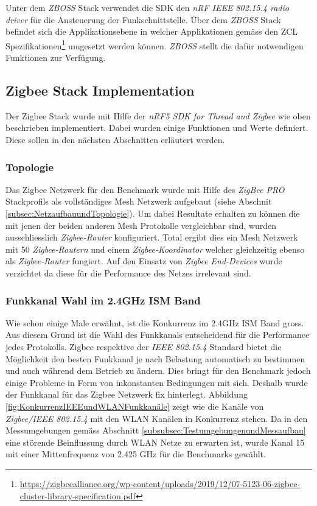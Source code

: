 Unter dem \textit{ZBOSS} Stack verwendet die SDK den \textit{nRF IEEE 802.15.4 radio driver} für die Ansteuerung der Funkschnittstelle.
Über dem \textit{ZBOSS} Stack befindet sich die Applikationsebene in welcher Applikationen gemäss den ZCL Spezifikationen\footnote{\url{https://zigbeealliance.org/wp-content/uploads/2019/12/07-5123-06-zigbee-cluster-library-specification.pdf}\cite{the_zigbee_alliance_zigbee_2016}} umgesetzt werden können.
\textit{ZBOSS} stellt die dafür notwendigen Funktionen zur Verfügung.


\subsection{Zigbee Stack Implementation}\label{subsec:ZigbeeStackImplementation}
Der Zigbee Stack wurde mit Hilfe der \textit{nRF5 SDK for Thread and Zigbee} wie oben beschrieben implementiert.
Dabei wurden einige Funktionen und Werte definiert.
Diese sollen in den nächsten Abschnitten erläutert werden.

\subsubsection{Topologie}\label{subsubsec:ZigbeeTopologie}
Das Zigbee Netzwerk für den Benchmark wurde mit Hilfe des \textit{ZigBee PRO} Stackprofils als vollständiges Mesh Netzwerk aufgebaut (siehe Abschnit \ref{subsec:NetzaufbauundTopologie}).
Um dabei Resultate erhalten zu können die mit jenen der beiden anderen Mesh Protokolle vergleichbar sind, wurden ausschliesslich \textit{Zigbee-Router} konfiguriert.
Total ergibt dies ein Mesh Netzwerk mit 50 \textit{Zigbee-Routern} und einem \textit{Zigbee-Koordinator} welcher gleichzeitig ebenso als \textit{Zigbee-Router} fungiert.
Auf den Einsatz von \textit{Zigbee End-Devices} wurde verzichtet da diese für die Performance des Netzes irrelevant sind.

\subsubsection{Funkkanal Wahl im 2.4GHz ISM Band}\label{subsubsec:FunkkanalWahlim2.4GHzISMBand}
Wie schon einige Male erwähnt, ist die Konkurrenz im 2.4GHz ISM Band gross.
Aus diesem Grund ist die Wahl des Funkkanals entscheidend für die Performance jedes Protokolls.
Zigbee respektive der \textit{IEEE 802.15.4} Standard bietet die Möglichkeit den besten Funkkanal je nach Belastung automatisch zu bestimmen und auch während dem Betrieb zu ändern.
Dies bringt für den Benchmark jedoch einige Probleme in Form von inkonstanten Bedingungen mit sich.
Deshalb wurde der Funkkanal für das Zigbee Netzwerk fix hinterlegt.
Abbildung \ref{fig:KonkurrenzIEEEundWLANFunkkanäle} zeigt wie die Kanäle von \textit{Zigbee/IEEE 802.15.4} mit den WLAN Kanälen in Konkurrenz stehen.
Da in den Messumgebungen gemäss Abschnitt \ref{subsubsec:TestumgebungenundMessaufbau} eine störende Beinflussung durch WLAN Netze zu erwarten ist, wurde Kanal 15 mit einer Mittenfrequenz von 2.425 GHz für die Benchmarks gewählt.

